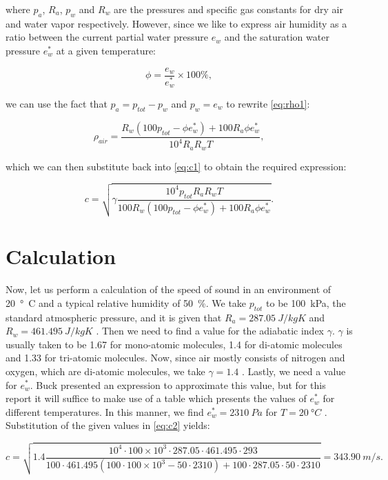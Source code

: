 \documentclass[11pt,titlepage]{report}
\begin{document}
where $p_a$, $R_a$, $p_w$ and $R_w$ are the pressures and specific gas constants for dry air and water vapor respectively. However, since we like to express air humidity as a ratio between the current partial water pressure $e_w$ and the saturation water pressure $e^*_w$ at a given temperature:

\begin{equation}
	\phi = \frac{e_w}{e^*_w} \times 100\%,
\end{equation}

we can use the fact that $p_a = p_{tot} - p_w$ and $p_w = e_w$ to rewrite \ref{eq:rho1}:

\begin{equation} \label{eq:rho2}
	\rho_{air} = \frac{R_w(100 p_{tot} - \phi e^*_w) + 100 R_a \phi e^*_w}{10^4 R_a R_w T},
\end{equation}

which we can then substitute back into \ref{eq:c1} to obtain the required expression:

\begin{equation} \label{eq:c2}
	c = \sqrt{\gamma \frac{10^4 p_{tot} R_a R_w T}{100 R_w(100 p_{tot} - \phi e^*_w) + 100 R_a \phi e^*_w}}.
\end{equation}
\cite{sengpiel-sound-speed,uiuc-rel-humid,wikipedia-speed-of-sound}

\section{Calculation}
Now, let us perform a calculation of the speed of sound in an environment of \SI{20}{\degree C} and a typical relative humidity of \SI{50}{\%}. We take $p_{tot}$ to be \SI{100}{kPa}, the standard atmospheric pressure, and it is given that $R_a = \SI{287.05}{J/kgK}$ and $R_w = \SI{461.495}{J/kgK}$ \cite{sengpiel-sound-speed}. Then we need to find a value for the adiabatic index $\gamma$. $\gamma$ is usually taken to be \num{1.67} for mono-atomic molecules, \num{1.4} for di-atomic molecules and \num{1.33} for tri-atomic molecules. Now, since air mostly consists of nitrogen and oxygen, which are di-atomic molecules, we take $\gamma = 1.4$ \cite{eng-tb-air-comp}. Lastly, we need a value for $e^*_w$. Buck \cite{buck-sat-press} presented an expression to approximate this value, but for this report it will suffice to make use of a table which presents the values of $e^*_w$ for different temperatures. In this manner, we find $e^*_w = \SI{2310}{Pa}$ for $T = \SI{20}{\degree C}$ \cite{eng-tb-sat-press}.
Substitution of the given values in \ref{eq:c2} yields:

\begin{equation}
	c = \sqrt{1.4 \frac{10^4 \cdot 100 \times 10^3 \cdot 287.05 \cdot 461.495 \cdot 293}{100 \cdot 461.495(100 \cdot 100 \times 10^3 - 50 \cdot 2310) + 100 \cdot 287.05 \cdot 50 \cdot 2310}} = \SI{343.90}{m/s}.
\end{equation}
\end{document}
